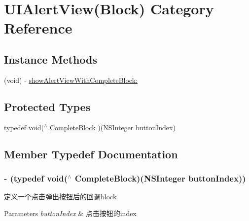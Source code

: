 \hypertarget{category_u_i_alert_view_07_block_08}{\section{U\+I\+Alert\+View(Block) Category Reference}
\label{category_u_i_alert_view_07_block_08}
}
\subsection*{Instance Methods}
\begin{DoxyCompactItemize}
\item 
(void) -\/ \hyperlink{category_u_i_alert_view_07_block_08_a911f8b6abd31cc0b95b98aff88de9515}{show\+Alert\+View\+With\+Complete\+Block\+:}
\end{DoxyCompactItemize}
\subsection*{Protected Types}
\begin{DoxyCompactItemize}
\item 
typedef void($^\wedge$ \hyperlink{category_u_i_alert_view_07_block_08_ab250b3fbf44082caf18f9ca597e5dcc5}{Complete\+Block} )(N\+S\+Integer button\+Index)
\end{DoxyCompactItemize}


\subsection{Member Typedef Documentation}
\hypertarget{category_u_i_alert_view_07_block_08_ab250b3fbf44082caf18f9ca597e5dcc5}{
\subsubsection[{Complete\+Block}]{\setlength{\rightskip}{0pt plus 5cm}-\/ (typedef void($^\wedge$ Complete\+Block)(N\+S\+Integer button\+Index))\hspace{0.3cm}{\ttfamily [protected]}}}\label{category_u_i_alert_view_07_block_08_ab250b3fbf44082caf18f9ca597e5dcc5}
定义一个点击弹出按钮后的回调block


\begin{DoxyParams}{Parameters}
{\em button\+Index} & 点击按钮的index \\
\hline
\end{DoxyParams}


